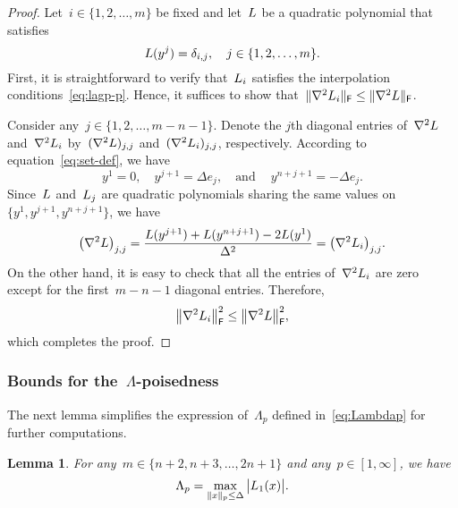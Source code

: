 \documentclass[draft]{article}
\numberwithin{equation}{section}
\theoremstyle{definition}
\theoremstyle{plain}
\newtheorem{lemma}{Lemma}[section]
\theoremstyle{remark}
\newcommand*{\abs}[2][]{#1\lvert#2#1\rvert}
\newcommand*{\lagp}[1][]{L\ifblank{#1}{}{_{#1}}}
\newcommand*{\norm}[2][]{#1\lVert#2#1\rVert}
\newcommand*{\set}[2][]{#1\{#2#1\}}
\begin{document}
\begin{proof}
    Let~$i \in \set{1, 2, \dots, m}$ be fixed and let~$\lagp$ be a quadratic polynomial that satisfies
    \begin{equation}
        \label{eq:lagp-p}
        \lagp(y^j) = \delta_{i, j}, \quad j \in \set{1, 2, \dots, m}.
    \end{equation}
    First, it is straightforward to verify that~$\lagp[i]$ satisfies the interpolation conditions~\eqref{eq:lagp-p}.
    Hence, it suffices to show that~$\|\nabla^2 \lagp[i]\|_\mathsf{F} \le \|\nabla^2 \lagp\|_\mathsf{F}$.

    Consider any~$j\in\{1,2,\dots, m-n-1\}$.
    Denote the $j$th diagonal entries of~$\nabla^2 \lagp$ and~$\nabla^2 \lagp[i]$ by~$(\nabla^2\lagp)_{j,j}$ and~$(\nabla^2\lagp[i])_{j,j}$, respectively.
    According to equation~\eqref{eq:set-def}, we have
    \begin{equation*}
        y^1 = 0, \quad y^{j + 1} = \Delta e_j, \quad \text{and} \quad~y^{n + j + 1} = -\Delta e_j.
    \end{equation*}
    Since~$\lagp$ and~$\lagp[j]$ are quadratic polynomials sharing the same values on~$\{y^1, y^{j+1},
    y^{n+j+1}\}$, we have
    \begin{equation*}
        \big(\nabla^2 \lagp \big)_{j,j}
        = \frac{\lagp(y^{j + 1}) + \lagp(y^{n + j + 1}) - 2 \lagp(y^1)}{\Delta^2}
        = \big(\nabla^2 \lagp[i] \big)_{j,j}.
    \end{equation*}
    On the other hand, it is easy to check that all the entries of~$\nabla^2 \lagp[i]$ are zero
    except for the first~$m-n-1$ diagonal entries. Therefore,
    \begin{equation*}
        \norm[\big]{\nabla^2 \lagp[i]}_{\mathsf{F}}^2 \le \norm[\big]{\nabla^2 \lagp}_{\mathsf{F}}^2,
    \end{equation*}
    which completes the proof.
\end{proof}

\subsubsection{Bounds for the~\texorpdfstring{$\Lambda$}{\textLambda}-poisedness}

The next lemma simplifies the expression of~$\Lambda_p$ defined in~\eqref{eq:Lambdap} for further computations.

\begin{lemma}
    \label{lem:lambda-p}
    For any~$m \in \set{n + 2, n + 3, \dots, 2n + 1}$ and any~$p \in [1, \infty]$, we have
    \begin{equation}
        \label{eq:lambda-p}
        \Lambda_p = \max_{\norm{x}_p \le \Delta} \abs[\big]{\lagp[1](x)}.
    \end{equation}
\end{lemma}
\end{document}
